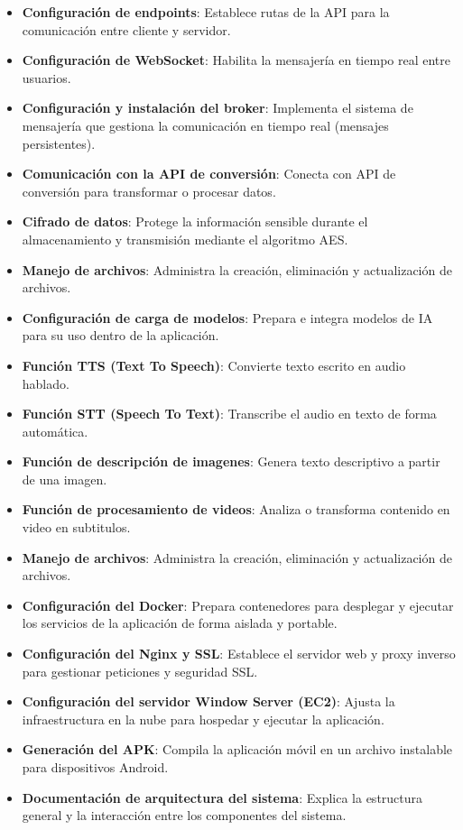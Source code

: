 \documentclass[lettersize,journal]{IEEEtran}
\begin{document}
\begin{itemize}
	\item \textbf{Configuración de endpoints}: Establece rutas de la API para la comunicación entre cliente y servidor.
	\item \textbf{Configuración de WebSocket}: Habilita la mensajería en tiempo real entre usuarios.
	\item \textbf{Configuración y instalación del broker}: Implementa el sistema de mensajería que gestiona la comunicación en tiempo real (mensajes persistentes).
	\item \textbf{Comunicación con la API de conversión}: Conecta con API de conversión para transformar o procesar datos.
	\item \textbf{Cifrado de datos}: Protege la información sensible durante el almacenamiento y transmisión mediante el algoritmo AES.
	\item \textbf{Manejo de archivos}: Administra la creación, eliminación y actualización de archivos.
	\item \textbf{Configuración de carga de modelos}: Prepara e integra modelos de IA para su uso dentro de la aplicación.
	\item \textbf{Función TTS (Text To Speech)}: Convierte texto escrito en audio hablado.
	\item \textbf{Función STT (Speech To Text)}: Transcribe el audio en texto de forma automática.
	\item \textbf{Función de descripción de imagenes}: Genera texto descriptivo a partir de una imagen.
	\item \textbf{Función de procesamiento de videos}: Analiza o transforma contenido en video en subtitulos.
	\item \textbf{Manejo de archivos}: Administra la creación, eliminación y actualización de archivos.
	\item \textbf{Configuración del Docker}: Prepara contenedores para desplegar y ejecutar los servicios de la aplicación de forma aislada y portable.
	\item \textbf{Configuración del Nginx y SSL}: Establece el servidor web y proxy inverso para gestionar peticiones y seguridad SSL.
	\item \textbf{Configuración del servidor Window Server (EC2)}: Ajusta la infraestructura en la nube para hospedar y ejecutar la aplicación.
	\item \textbf{Generación del APK}: Compila la aplicación móvil en un archivo instalable para dispositivos Android.
	\item \textbf{Documentación de arquitectura del sistema}: Explica la estructura general y la interacción entre los componentes del sistema.

\end{itemize}
\end{document}
